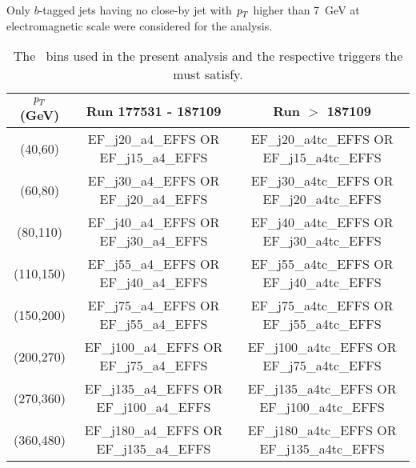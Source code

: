 Only $b$-tagged jets having no close-by jet with ${\emph{p}_{T}}$ higher than 7~GeV at electromagnetic scale were considered for the analysis. 

\begin{table}
\renewcommand{\arraystretch}{1.3}
\centering
{\small
\begin{tabular}{|   c   |   c   |   c   |}
\hline ${\emph{p}_{T}}$ (GeV) & Run 177531 - 187109 & Run $>$ 187109 \\  \hline
(40,60)     & EF\_j20\_a4\_EFFS  OR  EF\_j15\_a4\_EFFS  & EF\_j20\_a4tc\_EFFS OR  EF\_j15\_a4tc\_EFFS   \\ 
(60,80)     & EF\_j30\_a4\_EFFS  OR  EF\_j20\_a4\_EFFS  & EF\_j30\_a4tc\_EFFS OR  EF\_j20\_a4tc\_EFFS   \\ 
(80,110)    & EF\_j40\_a4\_EFFS  OR  EF\_j30\_a4\_EFFS  & EF\_j40\_a4tc\_EFFS OR  EF\_j30\_a4tc\_EFFS   \\ 
(110,150)   & EF\_j55\_a4\_EFFS  OR  EF\_j40\_a4\_EFFS  & EF\_j55\_a4tc\_EFFS OR  EF\_j40\_a4tc\_EFFS   \\ 
(150,200)   & EF\_j75\_a4\_EFFS  OR  EF\_j55\_a4\_EFFS  & EF\_j75\_a4tc\_EFFS OR  EF\_j55\_a4tc\_EFFS   \\ 
(200,270)   & EF\_j100\_a4\_EFFS OR  EF\_j75\_a4\_EFFS  & EF\_j100\_a4tc\_EFFS OR  EF\_j75\_a4tc\_EFFS  \\ 
(270,360)   & EF\_j135\_a4\_EFFS OR  EF\_j100\_a4\_EFFS & EF\_j135\_a4tc\_EFFS OR  EF\_j100\_a4tc\_EFFS \\ 
(360,480)   & EF\_j180\_a4\_EFFS OR  EF\_j135\_a4\_EFFS & EF\_j180\_a4tc\_EFFS OR  EF\_j135\_a4tc\_EFFS \\ %
\hline
\end{tabular}
}
\caption{The \pt\ bins used in the present analysis and the respective triggers the must satisfy.}
\label{tab:trigger}
\end{table}


